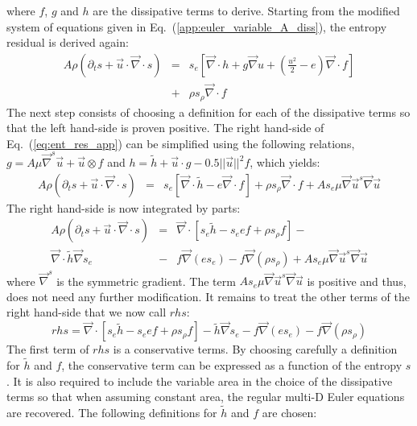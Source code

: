 \documentclass[preprint,10pt]{elsarticle}
\renewcommand{\div}{\vec{\nabla}\! \cdot \!}
\newcommand{\grad}{\vec{\nabla}}
\newcommand{\eqt}[1]{Eq.~(\ref{#1})}                     %
\begin{document}
where $f$, $g$ and $h$ are the dissipative terms to derive. Starting from the modified system of equations given in \eqt{app:euler_variable_A_diss}, the entropy residual is derived again:
\begin{eqnarray}
\label{eq:ent_res_app}
A \rho \left( \partial_t s + \vec{u} \cdot \div s \right) &=& s_e \left[ \div h + g \grad u + \left( \frac{u^2}{2}-e \right) \div f \right] \nonumber\\
&+& \rho s_{\rho} \div f
\end{eqnarray}
The next step consists of choosing a definition for each of the dissipative terms so that the left hand-side is proven positive. The right hand-side of \eqt{eq:ent_res_app} can be simplified using the following relations, $g = A \mu \grad^s \vec{u} + \vec{u} \otimes f$ and $h = \tilde{h} + \vec{u} \cdot g - 0.5 || \vec{u} ||^2 f$, which yields:
\begin{eqnarray}
\label{eq:ent_res_app2}
A \rho \left( \partial_t s + \vec{u} \cdot \div s \right) &=& s_e \left[ \div \tilde{h}-e \div f \right] + \rho s_{\rho} \div f  + A s_e \mu \grad \vec{u}^s \grad \vec{u}\nonumber
\end{eqnarray}
The right hand-side is now integrated by parts:
\begin{eqnarray}
\label{eq:ent_res_app3}
A \rho \left( \partial_t s + \vec{u} \cdot \div s \right) &=& \div \left[ s_e \tilde{h}-s_e e f  + \rho s_{\rho} f \right] -\nonumber \\
\div \tilde{h} \grad s_e  &-& f \grad (e s_e) -  f \grad ( \rho s_{\rho} ) + A s_e \mu \grad \vec{u}^s \grad \vec{u} \nonumber
\end{eqnarray}
where $\grad^s$ is the symmetric gradient. The term $A s_e \mu \grad \vec{u}^s \grad \vec{u}$ is positive and thus, does not need any further modification. It remains to treat the other terms of the right hand-side that we now call $rhs$:
\begin{equation}
rhs = \div \left[ s_e \tilde{h}-s_e e f  + \rho s_{\rho} f \right] - \tilde{h} \grad s_e  - f \grad (e s_e) - f \grad ( \rho s_{\rho} ) \nonumber
\end{equation}
The first term of $rhs$ is a conservative terms. By choosing carefully a definition for $\tilde{h}$ and $f$, the conservative term can be expressed as a function of the entropy $s$. It is also required to include the variable area in the choice of the dissipative terms so that when assuming constant area, the regular multi-D Euler equations are recovered. The following definitions for $\tilde{h}$ and $f$ are chosen:
\end{document}
